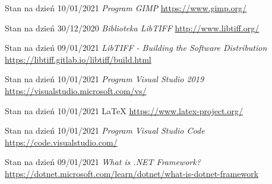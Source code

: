 \documentclass{article}
\begin{document}
\begin{thebibliography}{9}
        Stan na dzień 10/01/2021 
        \textit{Program GIMP}
        \url{https://www.gimp.org/}

        Stan na dzień 30/12/2020 
        \textit{Biblioteka LibTIFF}
        \url{http://www.libtiff.org/}

        Stan na dzień 09/01/2021 
        \textit{LibTIFF - Building the Software Distribution}
        \url{https://libtiff.gitlab.io/libtiff/build.html}

        Stan na dzień 10/01/2021 
        \textit{Program Visual Studio 2019}
        \url{https://visualstudio.microsoft.com/vs/}

        Stan na dzień 10/01/2021 
        \LaTeX 
        \url{https://www.latex-project.org/}

        Stan na dzień 10/01/2021 
        \textit{Program Visual Studio Code}
        \url{https://code.visualstudio.com/}

        Stan na dzień 09/01/2021 
        \textit{What is .NET Framework?}
        \url{https://dotnet.microsoft.com/learn/dotnet/what-is-dotnet-framework}

    \end{thebibliography}
    \newpage
    \listoffigures
\end{document}
